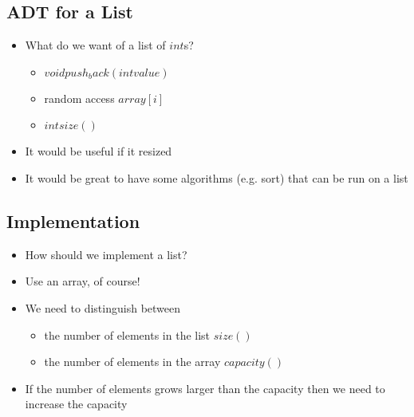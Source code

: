
\begin{slide}
\section{ADT for a List}

\pausebuild
\begin{itemize}
\item What do we want of a list of \jl$int$s?\pause
  \begin{itemize}
  \item \jl$void push_back(int value)$\pause
  \item random access \jl$array[i]$\pause
  \item \jl$int size()$\pause
  \end{itemize}
\item It would be useful if it resized\pause
\item It would be great to have some algorithms (e.g. sort) that can
  be run on a list\pause
\end{itemize}

\end{slide}


\begin{slide}
\section{Implementation}

\begin{itemize}
\item How should we implement a list?\pause
\item Use an array, of course!\pause
\item We need to distinguish between
  \begin{itemize}
  \item the number of elements in the list \jl$size()$
  \item the number of elements in the array \jl$capacity()$\pause
  \end{itemize}
\item If the number of elements grows larger than the capacity then we
  need to increase the capacity\pause
\end{itemize}
\end{slide}


